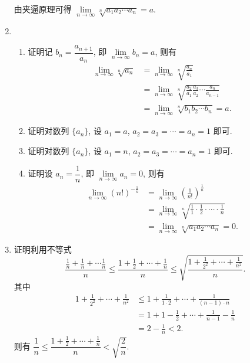 \begin{enumerate}
        由夹逼原理可得 $\lim\limits_{n\to\infty}\sqrt[n]{a_1a_2\cdots a_n} = a$.
    \item
        \begin{enumerate}[(1)]
            \item 
                {\heiti 证明}\quad 记 $b_n = \dfrac{a_{n+1}}{a_n}$, 即 $\lim\limits_{n\to\infty}b_n = a$, 则有
                \begin{align*}
                    \lim_{n\to\infty}\sqrt[n]{a_n} &= \lim_{n\to\infty}\sqrt[n]{\frac{a_n}{a_1}} \\
                                                   &= \lim_{n\to\infty}\sqrt[n]{\frac{a_2}{a_1} \frac{a_3}{a_2} \cdots \frac{a_n}{a_{n-1}}} \\
                                                   &= \lim_{n\to\infty}\sqrt[n]{b_1 b_2 \cdots b_n} = a.
                \end{align*}
            \item 
                {\heiti 证明}\quad 对数列 $\{a_n\}$, 设 $a_1 = a$, $a_2 = a_3 = \cdots = a_n = 1$ 即可.
            \item 
                {\heiti 证明}\quad 对数列 $\{a_n\}$, 设 $a_1 = n$, $a_2 = a_3 = \cdots = a_n = 1$ 即可.
            \item 
                {\heiti 证明}\quad 设 $a_n = \dfrac{1}{n}$, 即 $\lim\limits_{n\to\infty}a_n = 0$, 则有
                \begin{align*}
                    \lim_{n\to\infty}(n!)^{-\frac{1}{n}} &= \lim_{n\to\infty}\left(\frac{1}{n!}\right)^\frac{1}{n} \\
                                                         &= \lim_{n\to\infty}\sqrt[n]{\frac{1}{1} \cdot \frac{1}{2} \cdot \cdots \cdot \frac{1}{n}} \\
                                                         &= \lim_{n\to\infty}\sqrt[n]{a_1 a_2 \cdots a_n} = 0.
                \end{align*}
        \end{enumerate}
    \item
        {\heiti 证明}\quad 利用不等式
        \[
            \frac{\frac 1n + \frac 1n + \cdots \frac 1n}{n} \leqslant \frac{1 + \frac 12 + \cdots + \frac 1n}{n} \leqslant \sqrt{\frac{1 + \frac{1}{2^2} + \cdots + \frac{1}{n^2}}{n}}.    
        \]
        其中
        \begin{align*}
            1 + \frac{1}{2^2} + \cdots + \frac{1}{n^2} &\leqslant 1 + \frac{1}{1 \cdot 2} + \cdots + \frac{1}{(n-1) \cdot n} \\
            &= 1 + 1 - \frac 12 + \cdots + \frac{1}{n - 1} - \frac 1n \\
            &= 2 - \frac 1n < 2.
        \end{align*}
        则有 $\dfrac 1n \leqslant \dfrac{1 + \frac 12 + \cdots + \frac 1n}{n} < \sqrt{\dfrac 2n}$.


\end{enumerate}
